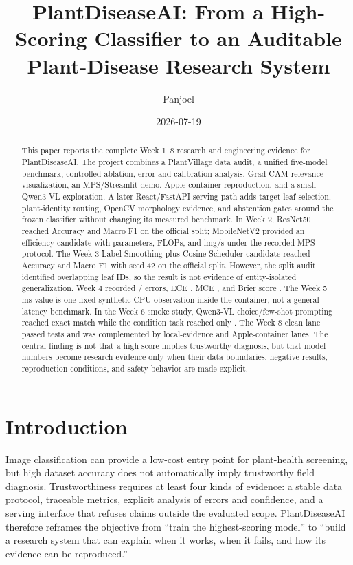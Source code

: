 \documentclass[11pt]{article}
\title{PlantDiseaseAI: From a High-Scoring Classifier to an Auditable Plant-Disease Research System}
\author{Panjoel}
\date{2026-07-19}
\begin{document}
\maketitle

\begin{abstract}
This paper reports the complete Week 1--8 research and engineering evidence for PlantDiseaseAI. The project combines a PlantVillage data audit, a unified five-model benchmark, controlled ablation, error and calibration analysis, Grad-CAM relevance visualization, an MPS/Streamlit demo, Apple container reproduction, and a small Qwen3-VL exploration. A later React/FastAPI serving path adds target-leaf selection, plant-identity routing, OpenCV morphology evidence, and abstention gates around the frozen classifier without changing its measured benchmark. In Week 2, ResNet50 reached Accuracy \PDAWeekTwoAccuracy{} and Macro F1 \PDAWeekTwoMacroFOne{} on the official split; MobileNetV2 provided an efficiency candidate with \PDAMobileParams{} parameters, \PDAMobileFlops{} FLOPs, and \PDAMobileThroughput{} img/s under the recorded MPS protocol. The Week 3 Label Smoothing plus Cosine Scheduler candidate reached Accuracy \PDAFinalAccuracy{} and Macro F1 \PDAFinalMacroFOne{} with seed 42 on the official split. However, the split audit identified \PDAOfficialOverlap{} overlapping leaf IDs, so the result is not evidence of entity-isolated generalization. Week 4 recorded \PDAErrorCount{}/\PDATestCount{} errors, ECE \PDAECE{}, MCE \PDAMCE{}, and Brier score \PDABrier{}. The Week 5 \PDADemoLatency{} ms value is one fixed synthetic CPU observation inside the container, not a general latency benchmark. In the Week 6 smoke study, Qwen3-VL choice/few-shot prompting reached \PDAVLMChoice{} exact match while the condition task reached only \PDAVLMCondition{}. The Week 8 clean lane passed \PDAWeekEightCleanTests{} tests and was complemented by local-evidence and Apple-container lanes. The central finding is not that a high score implies trustworthy diagnosis, but that model numbers become research evidence only when their data boundaries, negative results, reproduction conditions, and safety behavior are made explicit.
\end{abstract}

\section{Introduction}

Image classification can provide a low-cost entry point for plant-health screening, but high dataset accuracy does not automatically imply trustworthy field diagnosis. Trustworthiness requires at least four kinds of evidence: a stable data protocol, traceable metrics, explicit analysis of errors and confidence, and a serving interface that refuses claims outside the evaluated scope. PlantDiseaseAI therefore reframes the objective from ``train the highest-scoring model'' to ``build a research system that can explain when it works, when it fails, and how its evidence can be reproduced.''
\end{document}
